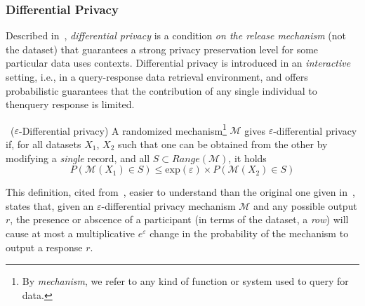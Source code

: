 \subsubsection{Differential Privacy}
\label{Theory:SDC:Guarantees:DifferentialPrivacy}

Described in~\citet{Dwork:DifferentialPrivacy}, \textit{differential privacy} is a condition \textit{on the release mechanism} (not the dataset) that guarantees a strong privacy preservation level for some particular data uses contexts. Differential privacy is introduced in an \textit{interactive} setting, i.e., in a query-response data retrieval environment, and offers probabilistic guarantees that the contribution of any single individual to thenquery response is limited.

\begin{definition}~($\varepsilon$-Differential privacy)
A randomized mechanism\footnote{By \textit{mechanism}, we refer to any kind of function or system used to query for data.} $\mathcal{M}$ gives $\varepsilon$-differential privacy if, for all datasets $X_1$, $X_2$ such that one can be obtained from the other by modifying a \textit{single} record, and all $S \subset Range(\mathcal{M})$, it holds
\begin{equation}
P(\mathcal{M}(X_1) \in S) \leq \mathrm{exp}(\varepsilon) \times P(\mathcal{M}(X_2) \in S)
\end{equation}
\end{definition}

This definition, cited from~\citet{Domingo:EnhancingDiffPrivMicroaggregation}, easier to understand than the original one given in~\citet{Dwork:DifferentialPrivacy}, states that, given an $\varepsilon$-differential privacy mechanism $\mathcal{M}$ and any possible output $r$, the presence or abscence of a participant (in terms of the dataset, a \textit{row}) will cause at most a multiplicative $e^\varepsilon$ change in the probability of the mechanism to output a response $r$.